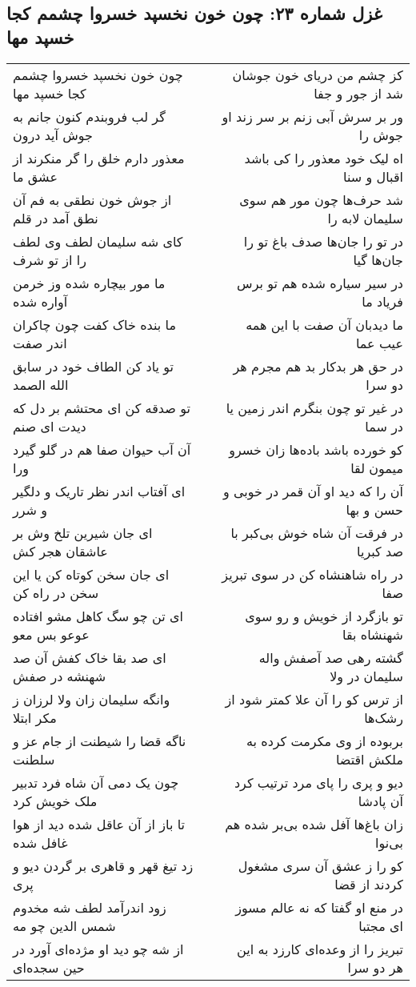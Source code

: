 \begin{center}
\section*{غزل شماره ۲۳: چون خون نخسپد خسروا چشمم کجا خسپد مها}
\label{sec:0023}
\begin{longtable}{l p{0.5cm} r}
چون خون نخسپد خسروا چشمم کجا خسپد مها
&&
کز چشم من دریای خون جوشان شد از جور و جفا
\\
گر لب فروبندم کنون جانم به جوش آید درون
&&
ور بر سرش آبی زنم بر سر زند او جوش را
\\
معذور دارم خلق را گر منکرند از عشق ما
&&
اه لیک خود معذور را کی باشد اقبال و سنا
\\
از جوش خون نطقی به فم آن نطق آمد در قلم
&&
شد حرف‌ها چون مور هم سوی سلیمان لابه را
\\
کای شه سلیمان لطف وی لطف را از تو شرف
&&
در تو را جان‌ها صدف باغ تو را جان‌ها گیا
\\
ما مور بیچاره شده وز خرمن آواره شده
&&
در سیر سیاره شده هم تو برس فریاد ما
\\
ما بنده خاک کفت چون چاکران اندر صفت
&&
ما دیدبان آن صفت با این همه عیب عما
\\
تو یاد کن الطاف خود در سابق الله الصمد
&&
در حق هر بدکار بد هم مجرم هر دو سرا
\\
تو صدقه کن ای محتشم بر دل که دیدت ای صنم
&&
در غیر تو چون بنگرم اندر زمین یا در سما
\\
آن آب حیوان صفا هم در گلو گیرد ورا
&&
کو خورده باشد باده‌ها زان خسرو میمون لقا
\\
ای آفتاب اندر نظر تاریک و دلگیر و شرر
&&
آن را که دید او آن قمر در خوبی و حسن و بها
\\
ای جان شیرین تلخ وش بر عاشقان هجر کش
&&
در فرقت آن شاه خوش بی‌کبر با صد کبریا
\\
ای جان سخن کوتاه کن یا این سخن در راه کن
&&
در راه شاهنشاه کن در سوی تبریز صفا
\\
ای تن چو سگ کاهل مشو افتاده عوعو بس معو
&&
تو بازگرد از خویش و رو سوی شهنشاه بقا
\\
ای صد بقا خاک کفش آن صد شهنشه در صفش
&&
گشته رهی صد آصفش واله سلیمان در ولا
\\
وانگه سلیمان زان ولا لرزان ز مکر ابتلا
&&
از ترس کو را آن علا کمتر شود از رشک‌ها
\\
ناگه قضا را شیطنت از جام عز و سلطنت
&&
بربوده از وی مکرمت کرده به ملکش اقتضا
\\
چون یک دمی آن شاه فرد تدبیر ملک خویش کرد
&&
دیو و پری را پای مرد ترتیب کرد آن پادشا
\\
تا باز از آن عاقل شده دید از هوا غافل شده
&&
زان باغ‌ها آفل شده بی‌بر شده هم بی‌نوا
\\
زد تیغ قهر و قاهری بر گردن دیو و پری
&&
کو را ز عشق آن سری مشغول کردند از قضا
\\
زود اندرآمد لطف شه مخدوم شمس الدین چو مه
&&
در منع او گفتا که نه عالم مسوز ای مجتبا
\\
از شه چو دید او مژده‌ای آورد در حین سجده‌ای
&&
تبریز را از وعده‌ای کارزد به این هر دو سرا
\\
\end{longtable}
\end{center}
